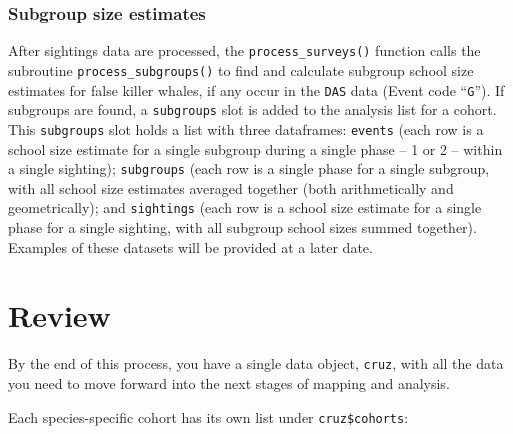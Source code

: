 \documentclass[
]{book}
\newenvironment{Shaded}{\begin{snugshade}}{\end{snugshade}}
\newcommand{\DecValTok}[1]{\textcolor[rgb]{0.00,0.00,0.81}{#1}}
\newcommand{\NormalTok}[1]{#1}
\newcommand{\OperatorTok}[1]{\textcolor[rgb]{0.81,0.36,0.00}{\textbf{#1}}}
\newcommand{\StringTok}[1]{\textcolor[rgb]{0.31,0.60,0.02}{#1}}
\begin{document}
\hypertarget{subgroups}{%
\subsubsection*{Subgroup size estimates}\label{subgroups}}

After sightings data are processed, the \texttt{process\_surveys()} function calls the subroutine \texttt{process\_subgroups()} to find and calculate subgroup school size estimates for false killer whales, if any occur in the \texttt{DAS} data (Event code ``\texttt{G}''). If subgroups are found, a \texttt{subgroups} slot is added to the analysis list for a cohort. This \texttt{subgroups} slot holds a list with three dataframes: \texttt{events} (each row is a school size estimate for a single subgroup during a single phase -- 1 or 2 -- within a single sighting); \texttt{subgroups} (each row is a single phase for a single subgroup, with all school size estimates averaged together (both arithmetically and geometrically); and \texttt{sightings} (each row is a school size estimate for a single phase for a single sighting, with all subgroup school sizes summed together). Examples of these datasets will be provided at a later date.

\hypertarget{review}{%
\section*{Review}\label{review}}

By the end of this process, you have a single data object, \texttt{cruz}, with all the data you need to move forward into the next stages of mapping and analysis.

\begin{Shaded}
\end{Shaded}

Each species-specific cohort has its own list under \texttt{cruz\$cohorts}:

\begin{Shaded}
\end{Shaded}
\end{document}

